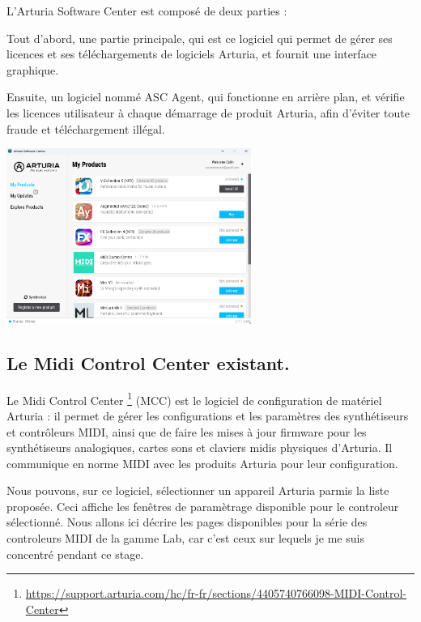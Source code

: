 \documentclass[francais]{rapportPFE}  %
\begin{document}
L’Arturia Software Center est composé de deux parties : 

Tout d'abord, une partie principale, qui est ce logiciel qui permet de gérer ses licences et ses téléchargements de logiciels Arturia, et fournit une interface graphique.

Ensuite, un logiciel nommé ASC Agent, qui fonctionne en arrière plan, et vérifie les licences utilisateur à chaque démarrage de produit Arturia, afin d'éviter toute fraude et téléchargement illégal.

\begin{center}
	\centering
	\includegraphics[width=0.6\textwidth]{graphics/asc_existant.png}
	\begin{tiny}
	\end{tiny}
	\label{fig}
\end{center}

\subsection{Le Midi Control Center existant.}

Le Midi Control Center
\footnote{\url{https://support.arturia.com/hc/fr-fr/sections/4405740766098-MIDI-Control-Center}}
 (MCC) est le logiciel de configuration de matériel Arturia : il
permet de gérer les configurations et les paramètres des synthétiseurs et contrôleurs MIDI, ainsi que de faire les mises à jour firmware pour les synthétiseurs analogiques, cartes sons et claviers midis physiques d’Arturia. Il communique en norme MIDI avec les produits Arturia pour leur configuration.

Nous pouvons, sur ce logiciel, sélectionner un appareil Arturia parmis la liste proposée. Ceci affiche les fenêtres de paramètrage disponible pour le controleur sélectionné. Nous allons ici décrire les pages disponibles pour la série des controleurs MIDI de la gamme Lab, car c'est ceux sur lequels je me suis concentré pendant ce stage.
\end{document}
